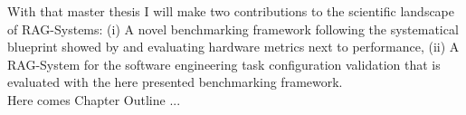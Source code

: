 With that master thesis I will make two contributions to the scientific landscape of RAG-Systems: (i) A novel benchmarking framework following the systematical blueprint showed by \citet{Simon.10112024} and evaluating hardware metrics next to performance, (ii) A RAG-System for the software engineering task configuration validation that is evaluated with the here presented benchmarking framework. \\[24pt]


\large Here comes Chapter Outline ...
